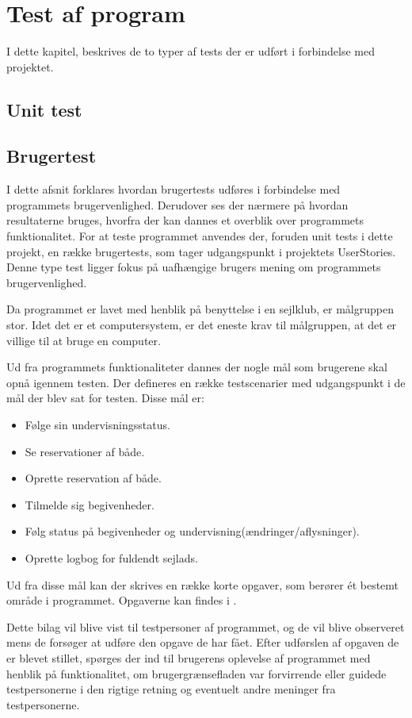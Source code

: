 \chapter{Test af program}
I dette kapitel, beskrives de to typer af tests der er udført i forbindelse med projektet.

\section{Unit test}


\section{Brugertest}
I dette afsnit forklares hvordan brugertests udføres i forbindelse med programmets brugervenlighed.
Derudover ses der nærmere på hvordan resultaterne bruges, hvorfra der kan dannes et overblik over programmets funktionalitet. 
For at teste programmet anvendes der, foruden unit tests i dette projekt, en række brugertests, som tager udgangspunkt i projektets UserStories.
Denne type test ligger fokus på uafhængige brugers mening om programmets brugervenlighed.

Da programmet er lavet med henblik på benyttelse i en sejlklub, er målgruppen stor. 
Idet det er et computersystem, er det eneste krav til målgruppen, at det er villige til at bruge en computer.

Ud fra programmets funktionaliteter dannes der nogle mål som brugerene skal opnå igennem testen. 
Der defineres en række testscenarier med udgangspunkt i de mål der blev sat for testen.
Disse mål er:
\begin{itemize}
  \item Følge sin undervisningsstatus.
  \item Se reservationer af både.
  \item Oprette reservation af både.
  \item Tilmelde sig begivenheder.
  \item Følg status på begivenheder og undervisning(ændringer/aflysninger).
  \item Oprette logbog for fuldendt sejlads.
\end{itemize}

Ud fra disse mål kan der skrives en række korte opgaver, som berører ét bestemt område i programmet. 
Opgaverne kan findes i .

Dette bilag vil blive vist til testpersoner af programmet, og de vil blive observeret mens de forsøger at udføre den opgave de har fået. 
Efter udførslen af opgaven de er blevet stillet, spørges der ind til brugerens oplevelse af programmet med henblik på funktionalitet, om brugergrænsefladen var forvirrende eller guidede testpersonerne i den rigtige retning og eventuelt andre meninger fra testpersonerne.

